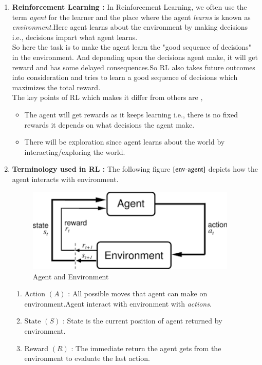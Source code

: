 \documentclass[journal,12pt,onecolumn]{IEEEtran}
\providecommand{\brak}[1]{\ensuremath{\left(#1\right)}}
\theoremstyle{remark}
\numberwithin{equation}{section}
\begin{document}
\begin{enumerate}
	\item	\textbf{Reinforcement Learning :} In Reinforcement Learning, we often use the term \textit{agent} for the learner and the place where the agent \textit{learns} is known as \textit{environment}.Here agent learns about the environment by making decisions i.e., decisions impart what agent learns. \\
		  So here the task is to make the agent learn the "good sequence of decisions" in the environment. And depending upon the decisions agent make, it will get reward and has some delayed consequences.So RL also takes future outcomes into consideration and tries to learn a good sequence of decisions which maximizes the total reward.\\
	The key points of RL which makes it differ from others are ,
	         \begin{itemize}
		     \item The agent will get rewards as it keeps learning i.e., there is no fixed rewards it depends on what decisions the agent make.
		     \item There will be exploration since agent learns about the world by interacting/exploring the world.
		 \end{itemize}
	\item \textbf{Terminology used in RL :} The following figure $\ref{env-agent}$ depicts how the agent interacts with environment.
	      \begin{figure}
		      \centering
		      \includegraphics[width = 10cm]{Figs/action-state.png}
                      \caption{Agent and Environment}
		      \label{env-agent}
	      \end{figure}
	   \begin{enumerate}
		   \item Action $\brak{A}$ : All possible moves that agent can make on environment.Agent interact with environment with \emph{actions}. 
	     \item State $\brak{S}$ : State is the current position of agent returned by environment.
	     \item Reward $\brak{R}$ : The immediate return the agent gets from the environment to evaluate the last action.

\end{enumerate}
\end{enumerate}
\end{document}
